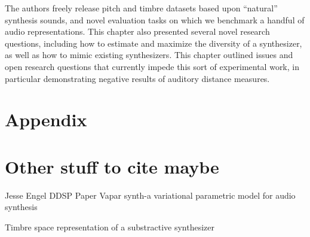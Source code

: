 The authors freely release pitch and timbre datasets based upon ``natural'' synthesis sounds, and novel evaluation tasks on which we benchmark a handful of audio representations. This chapter also presented several novel research questions, including how to estimate and maximize the diversity of a synthesizer, as well as how to mimic existing synthesizers. This chapter outlined issues and open research questions that currently impede this sort of experimental work, in particular demonstrating negative results of auditory distance measures.

%
%

\iffalse
\section{Appendix}

\section{Other stuff to cite maybe}








Jesse Engel DDSP Paper \cite{engel2020ddsp}
Vapar synth-a variational parametric model for audio synthesis \cite{subramani2020vapar}

Timbre space representation of a substractive synthesizer \cite{vahidi2020timbre}

